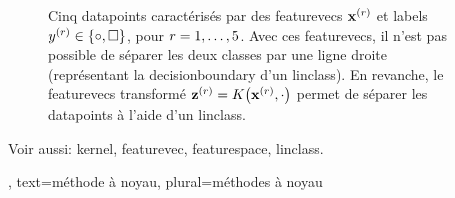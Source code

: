 {{\begin{figure}[H]
\begin{center}
		\end{center}
		\caption{
			Cinq \glspl{datapoint} caractérisés par des \glspl{featurevec} ${\bf x}^{(r)}$ 
			et \glspl{label} $y^{(r)} \in \{ \circ, \square \}$, pour $r=1, \ldots, 5$. 
			Avec ces \glspl{featurevec}, il n'est pas possible de séparer les deux classes par une ligne droite (représentant la \gls{decisionboundary} d'un \gls{linclass}). En revanche, le \glspl{featurevec} transformé ${\bf z}^{(r)} = K\big({\bf x}^{(r)},\cdot\big)$ permet de séparer les \glspl{datapoint} à l'aide d'un \gls{linclass}.  \label{fig_linsep_kernel_dict}}
	\end{figure}
	Voir aussi: \gls{kernel}, \gls{featurevec}, \gls{featurespace}, \gls{linclass}.
	},
	text={méthode à noyau}, plural={méthodes à noyau}
}

